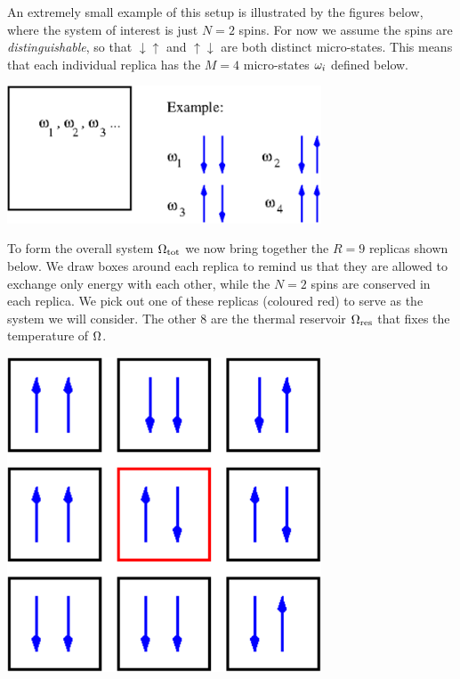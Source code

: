 An extremely small example of this setup is illustrated by the figures below, where the system of interest is just $N = 2$ spins.
For now we assume the spins are \textit{distinguishable}, so that $\downarrow\uparrow$ and $\uparrow\downarrow$ are both distinct micro-states.
This means that each individual replica has the $M = 4$ micro-states $\omega_i$ defined below.
\begin{center}
  \includegraphics[width=0.7\textwidth]{figs/unit03_spin-system.pdf}
\end{center}
To form the overall system $\Omega_{\text{tot}}$ we now bring together the $R = 9$ replicas shown below.
We draw boxes around each replica to remind us that they are allowed to exchange only energy with each other, while the $N = 2$ spins are conserved in each replica.
We pick out one of these replicas (coloured red) to serve as the system \Om we will consider.
The other $8$ are the thermal reservoir $\Omega_{\text{res}}$ that fixes the temperature of $\Omega$.
\begin{center}
  \includegraphics[width=0.7\textwidth]{figs/unit03_spin-reservoir.pdf}
\end{center}

